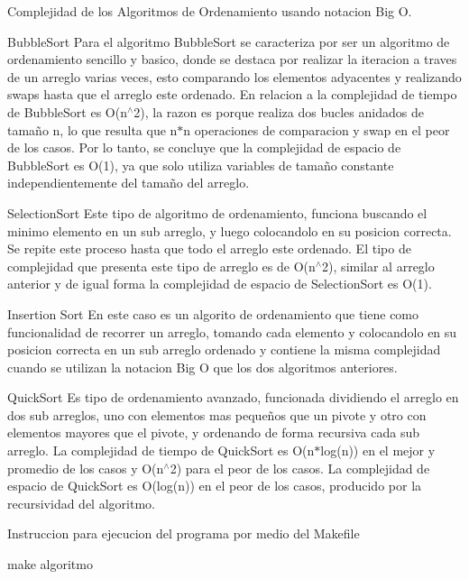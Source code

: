Complejidad de los Algoritmos de Ordenamiento usando notacion Big O.


\begin{DoxyEnumerate}
\item Bubble\+Sort Para el algoritmo Bubble\+Sort se caracteriza por ser un algoritmo de ordenamiento sencillo y basico, donde se destaca por realizar la iteracion a traves de un arreglo varias veces, esto comparando los elementos adyacentes y realizando swaps hasta que el arreglo este ordenado. En relacion a la complejidad de tiempo de Bubble\+Sort es O(n$^\wedge$2), la razon es porque realiza dos bucles anidados de tamaño n, lo que resulta que n$\ast$n operaciones de comparacion y swap en el peor de los casos. Por lo tanto, se concluye que la complejidad de espacio de Bubble\+Sort es O(1), ya que solo utiliza variables de tamaño constante independientemente del tamaño del arreglo.
\item Selection\+Sort Este tipo de algoritmo de ordenamiento, funciona buscando el minimo elemento en un sub arreglo, y luego colocandolo en su posicion correcta. Se repite este proceso hasta que todo el arreglo este ordenado. El tipo de complejidad que presenta este tipo de arreglo es de O(n$^\wedge$2), similar al arreglo anterior y de igual forma la complejidad de espacio de Selection\+Sort es O(1).
\item Insertion Sort En este caso es un algorito de ordenamiento que tiene como funcionalidad de recorrer un arreglo, tomando cada elemento y colocandolo en su posicion correcta en un sub arreglo ordenado y contiene la misma complejidad cuando se utilizan la notacion Big O que los dos algoritmos anteriores.
\item Quick\+Sort Es tipo de ordenamiento avanzado, funcionada dividiendo el arreglo en dos sub arreglos, uno con elementos mas pequeños que un pivote y otro con elementos mayores que el pivote, y ordenando de forma recursiva cada sub arreglo. La complejidad de tiempo de Quick\+Sort es O(n$\ast$log(n)) en el mejor y promedio de los casos y O(n$^\wedge$2) para el peor de los casos. La complejidad de espacio de Quick\+Sort es O(log(n)) en el peor de los casos, producido por la recursividad del algoritmo.
\end{DoxyEnumerate}

Instruccion para ejecucion del programa por medio del Makefile

make algoritmo 